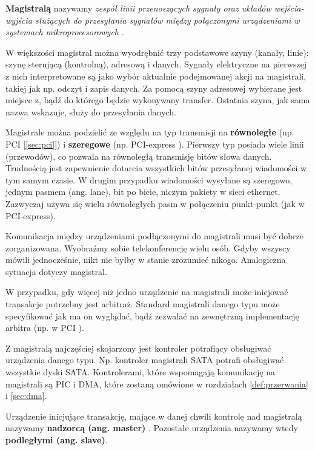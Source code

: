 \documentclass[shortabstract,inz]{iithesis}
\begin{document}
\textbf{Magistralą} nazywamy \textit{zespół linii przenoszących sygnały oraz układów
wejścia-wyjścia służących do przesyłania sygnałów między połączonymi
urządzeniami w systemach mikroprocesorowych} \cite{wiki:magistrala_def}.

W większości magistral można wyodrębnić trzy podstawowe szyny (kanały, linie):
szynę sterującą (kontrolną), adresową i danych. Sygnały elektryczne na pierwszej
z nich interpretowane są jako wybór aktualnie podejmowanej akcji na magistrali, takiej jak
np. odczyt i zapis danych. Za pomocą szyny adresowej wybierane jest miejsce z, bądź do którego
będzie wykonywany transfer. 
Ostatnia szyna, jak sama nazwa wskazuje, służy do przesyłania danych.

Magistrale można podzielić ze względu na typ transmisji na \textbf{równoległe} (np. PCI [\ref{sec:pci}]) i \textbf{szeregowe} (np. PCI-express \cite{pcie}).
Pierwszy typ posiada wiele linii (przewodów), co pozwala na równoległą transmisję bitów słowa danych.
Trudnością jest zapewnienie dotarcia wszystkich bitów przesyłanej wiadomości w tym samym czasie.
W drugim przypadku wiadomości wysyłane są szeregowo, jednym pasmem (ang. lane), bit po bicie,
niczym pakiety w sieci ethernet.
Zazwyczaj używa się wielu równoległych pasm w połączeniu punkt-punkt \cite{wiki:point_point} (jak w PCI-express).

Komunikacja między urządzeniami podłączonymi do magistrali musi być dobrze
zorganizowana. Wyobraźmy sobie telekonferencję wielu osób. Gdyby wszyscy mówili jednocześnie,
nikt nie byłby w stanie zrozumieć nikogo. Analogiczna sytuacja dotyczy magistral.

W przypadku, gdy więcej niż jedno urządzenie na magistrali może inicjować
transakcje potrzebny jest arbitraż. Standard
magistrali danego typu może specyfikować jak ma on wyglądać, 
bądź zezwalać na zewnętrzną implementację arbitra (np. w PCI \cite{pci_arbitration}).

Z magistralą najczęściej skojarzony jest kontroler potrafiący obsługiwać urządzenia danego typu.
Np. kontroler magistrali SATA potrafi obsługiwać wszystkie dyski SATA.
Kontrolerami, które wspomagają komunikację na magistrali są PIC i DMA, które
zostaną omówione w rozdziałach \ref{def:przerwania} i \ref{sec:dma}.

Urządzenie inicjujące transakcję, mające w danej chwili kontrolę nad magistralą
nazywamy \textbf{nadzorcą (ang. master)} \label{def:master/slave}. Pozostałe urządzenia nazywamy wtedy 
\textbf{podległymi (ang. slave)}.
\end{document}
